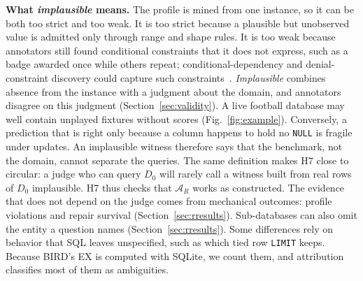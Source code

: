 \textbf{What \emph{implausible} means.} The profile is mined from one instance, so it can be both too strict and too weak. It is too strict because a plausible but unobserved value is admitted only through range and shape rules. It is too weak because annotators still found conditional constraints that it does not express, such as a badge awarded once while others repeat; conditional-dependency and denial-constraint discovery could capture such constraints~\cite{fan2011cfd,chu2013dc}. \emph{Implausible} combines absence from the instance with a judgment about the domain, and annotators disagree on this judgment (Section~\ref{sec:validity}). A live football database may well contain unplayed fixtures without scores (Fig.~\ref{fig:example}). Conversely, a prediction that is right only because a column happens to hold no \texttt{NULL} is fragile under updates. An implausible witness therefore says that the benchmark, not the domain, cannot separate the queries. The same definition makes H7 close to circular: a judge who can query $D_0$ will rarely call a witness built from real rows of $D_0$ implausible. H7 thus checks that $\mathcal A_R$ works as constructed. The evidence that does not depend on the judge comes from mechanical outcomes: profile violations and repair survival (Section~\ref{sec:rresults}). Sub-databases can also omit the entity a question names (Section~\ref{sec:rresults}). Some differences rely on behavior that SQL leaves unspecified, such as which tied row \texttt{LIMIT} keeps. Because BIRD's EX is computed with SQLite, we count them, and attribution classifies most of them as ambiguities.

